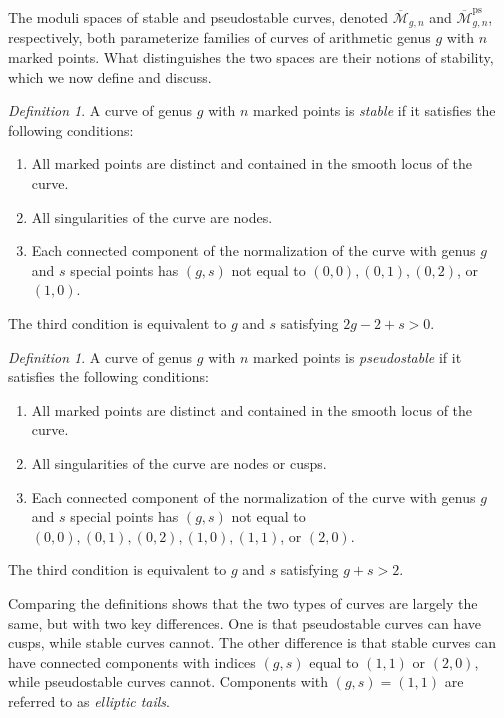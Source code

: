 \documentclass[leqno,12pt]{amsart}
\theoremstyle{remark}
\newtheorem{definition}[theorem]{Definition}
\numberwithin{equation}{section}
\DeclareMathOperator{\ps}{ps}
\begin{document}
The moduli spaces of stable and pseudostable curves, denoted $\overline{\mathcal{M}}_{g, n}$ and $\overline{\mathcal{M}}^{\ps}_{g, n}$, respectively, both parameterize families of curves of arithmetic genus $g$ with $n$ marked points. What distinguishes the two spaces are their notions of stability, which we now define and discuss.

\begin{definition}\label{DEFstable} A curve of genus $g$ with $n$ marked points is \emph{stable} if it satisfies the following conditions:
\begin{enumerate}
    \item All marked points are distinct and contained in the smooth locus of the curve.
    \item All singularities of the curve are nodes.
    \item Each connected component of the normalization of the curve with genus $g$ and $s$ special points has $(g, s)$ not equal to $(0, 0), (0, 1), (0, 2)$, or $(1, 0).$
\end{enumerate}
The third condition is equivalent to $g$ and $s$ satisfying $2g - 2 + s > 0$.
\end{definition}

\begin{definition}\label{DEFps} A curve of genus $g$ with $n$ marked points is \emph{pseudostable} if it satisfies the following conditions:
\begin{enumerate}
    \item All marked points are distinct and contained in the smooth locus of the curve.
    \item All singularities of the curve are nodes or cusps.
    \item Each connected component of the normalization of the curve with genus $g$ and $s$ special points has $(g, s)$ not equal to $(0, 0), (0, 1), (0, 2), (1, 0), (1, 1)$, or $(2, 0)$.
\end{enumerate}
The third condition is equivalent to $g$ and $s$ satisfying $g + s > 2$.
\end{definition}
Comparing the definitions shows that the two types of curves are largely the same, but with two key differences. One is that pseudostable curves can have cusps, while stable curves cannot. The other difference is that stable curves can have connected components with indices $(g, s)$ equal to $(1, 1)$ or $(2, 0)$, while pseudostable curves cannot. Components with $(g, s) = (1, 1)$ are referred to as \textit{elliptic tails}.
\end{document}

